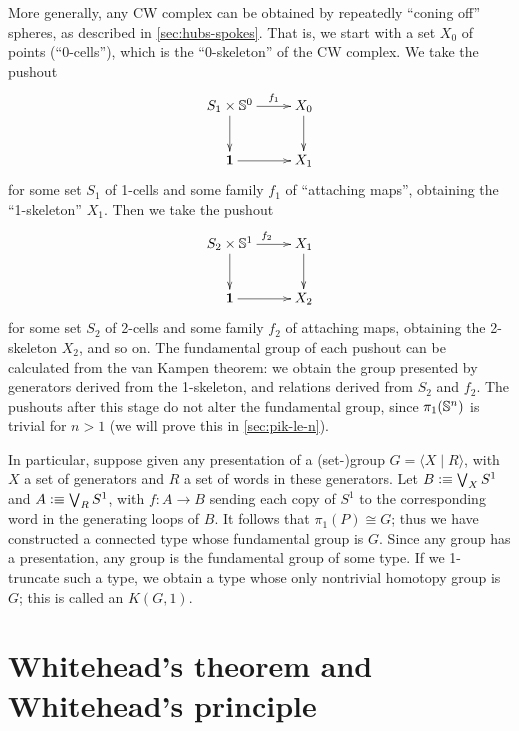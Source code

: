 \begin{eg}
  More generally, any CW complex can be obtained by repeatedly ``coning off'' spheres, as described in \autoref{sec:hubs-spokes}.
  That is, we start with a set $X_0$ of points (``0-cells''), which is the ``0-skeleton'' of the CW complex.
  We take the pushout
  \begin{equation*}
    \vcenter{\xymatrix{
        S_1 \times \Sn^0\ar[r]^-{f_1}\ar[d] &
        X_0\ar[d]\\
        \unit \ar[r] &
        X_1
      }}
  \end{equation*}
  for some set $S_1$ of 1-cells and some family $f_1$ of ``attaching maps'', obtaining the ``1-skeleton'' $X_1$.
  Then we take the pushout
  \begin{equation*}
    \vcenter{\xymatrix{
        S_2 \times \Sn^1\ar[r]^{f_2}\ar[d] &
        X_1\ar[d]\\
        \unit \ar[r] &
        X_2
      }}
  \end{equation*}
  for some set $S_2$ of 2-cells and some family $f_2$ of attaching maps, obtaining the 2-skeleton $X_2$, and so on.
  The fundamental group of each pushout can be calculated from the van Kampen theorem: we obtain the group presented by generators derived from the 1-skeleton, and relations derived from $S_2$ and $f_2$.
  The pushouts after this stage do not alter the fundamental group, since $\pi_1(\mathbb{S}^n)$ is trivial for $n>1$ (we will prove this in \autoref{sec:pik-le-n}).
\end{eg}

\begin{eg}\label{eg:kg1}
  In particular, suppose given any presentation of a (set-)group $G = \langle X \mid R \rangle$, with $X$ a set of generators and $R$ a set of words in these generators.
  Let $B\vcentcolon\equiv \bigvee_X S^1$ and $A\vcentcolon\equiv \bigvee_R S^1$, with $f:A\to B$ sending each copy of $S^1$ to the corresponding word in the generating loops of $B$.
  It follows that $\pi_1(P) \cong G$; thus we have constructed a connected type whose fundamental group is $G$.
  Since any group has a presentation, any group is the fundamental group of some type.
  If we 1-truncate such a type, we obtain a type whose only nontrivial homotopy group is $G$; this is called an  $K(G,1)$.
\end{eg}


\section{Whitehead's theorem and Whitehead's principle}
\label{sec:whitehead}

